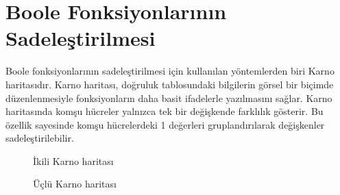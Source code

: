 \section{Boole Fonksiyonlarının Sadeleştirilmesi}

Boole fonksiyonlarının sadeleştirilmesi için kullanılan yöntemlerden biri Karno haritasıdır. Karno haritası, doğruluk tablosundaki bilgilerin görsel bir biçimde düzenlenmesiyle fonksiyonların daha basit ifadelerle yazılmasını sağlar. Karno haritasında komşu hücreler yalnızca tek bir değişkende farklılık gösterir. Bu özellik sayesinde komşu hücrelerdeki 1 değerleri gruplandırılarak değişkenler sadeleştirilebilir.

\begin{figure}[H]
\centering
{}
\caption{İkili Karno haritası}
\label{fig:B.5}
\end{figure}

\begin{figure}[H]
\centering
{}
\caption{Üçlü Karno haritası}
\label{fig:B.6}
\end{figure}


